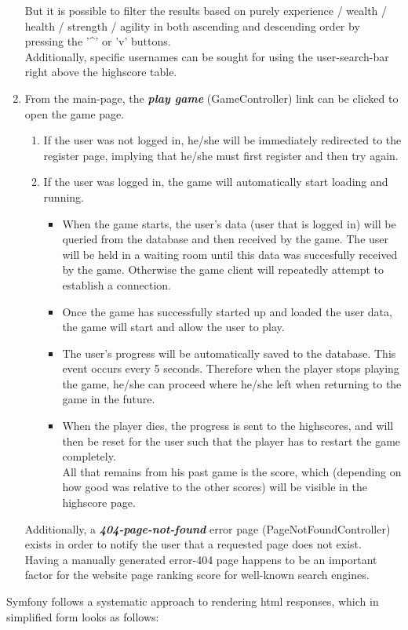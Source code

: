 \documentclass[12pt]{report}
\begin{document}
\begin{enumerate}
But it is possible to filter the results based on purely experience / wealth / health / strength / agility in both ascending and descending order by pressing the '\textasciicircum' or 'v' buttons.\\
Additionally, specific usernames can be sought for using the user-search-bar right above the highscore table.
\item From the main-page, the \emph{\textbf{play game}} (GameController) link can be clicked to open the game page.
\begin{enumerate}
\item If the user was not logged in, he/she will be immediately redirected to the register page, implying that he/she must first register and then try again.
\item If the user was logged in, the game will automatically start loading and running.
\begin{itemize}
\item When the game starts, the user's data (user that is logged in) will be queried from the database and then received by the game. The user will be held in a waiting room until this data was succesfully received by the game. Otherwise the game client will repeatedly attempt to establish a connection.
\item Once the game has successfully started up and loaded the user data, the game will start and allow the user to play.
\item The user's progress will be automatically saved to the database. This event occurs every 5 seconds. Therefore when the player stops playing the game, he/she can proceed where he/she left when returning to the game in the future.
\item When the player dies, the progress is sent to the highscores, and will then be reset for the user such that the player has to restart the game completely.\\All that remains from his past game is the score, which (depending on how good was relative to the other scores) will be visible in the highscore page.
\end{itemize}
\end{enumerate}
Additionally, a \emph{\textbf{404-page-not-found}} error page (PageNotFoundController) exists in order to notify the user that a requested page does not exist.\\
Having a manually generated error-404 page happens to be an important factor for the website page ranking score for well-known search engines.
\end{enumerate}
Symfony follows a systematic approach to rendering html responses, which in simplified form looks as follows:
\end{document}

